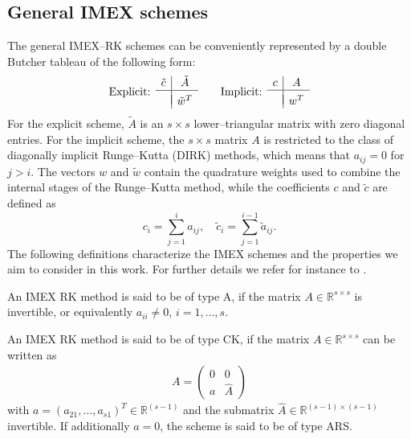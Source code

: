 \documentclass[final,11pt]{siamart251216}
\numberwithin{equation}{section}
\theoremstyle{definition}
\theoremstyle{remark}
\begin{document}
\subsection{General IMEX schemes}
The general IMEX–RK schemes can be conveniently represented by a double Butcher tableau of the following form:
\begin{align}
	\text{Explicit: } 
	\begin{array}{c|c}
		\tilde{c} & \tilde{A} \\ \hline \\ [-1.9ex]
		& \tilde{w}^T
	\end{array}
	\qquad
	\text{Implicit: }
	\begin{array}{c|c}
		c & A \\ \hline \\[-1.9ex]
		& w^T
	\end{array}
\end{align}
For the explicit scheme, $\tilde{A}$ is an $s \times s$ lower–triangular matrix with zero diagonal entries.
For the implicit scheme, the $s \times s$ matrix $A$ is restricted to the class of diagonally implicit Runge–Kutta (DIRK) methods, which means that $a_{ij} = 0$ for $j > i$. The vectors $w$ and $\tilde{w}$ contain the quadrature weights used to combine the internal stages of the Runge–Kutta method, while the coefficients $c$ and $\tilde{c}$ are defined as
\[c_i = \sum_{j=1}^{i} a_{ij}, \quad \tilde{c}_i = \sum_{j=1}^{i-1} \tilde{a}_{ij}.\]
The following definitions characterize the IMEX schemes and the properties we aim to consider in this work. For further details we refer for instance to \cite{IMEX_PR}.
\begin{definition}
	An IMEX RK method is said to be of type A, if the matrix $A \in \mathbb{R}^{s \times s}$ is invertible, or equivalently $a_{ii} \neq 0$, $i = 1,\dots,s$.
\end{definition}
\begin{definition}
	An IMEX RK method is said to be of type CK, if the matrix $A \in \mathbb{R}^{s \times s}$ can be written as
	\begin{align*}A=\left(
		\begin{matrix}
			0 & 0 \\ a & \hat{A}
		\end{matrix}\right)
	\end{align*}
	with $a = (a_{21},\dots,a_{s1})^T \in \mathbb{R}^{(s-1)}$ and the submatrix $\hat{A} \in \mathbb{R}^{(s-1) \times (s-1)}$ invertible. If additionally $a = 0$, the scheme is said to be of type ARS.
\end{definition}
\end{document}
